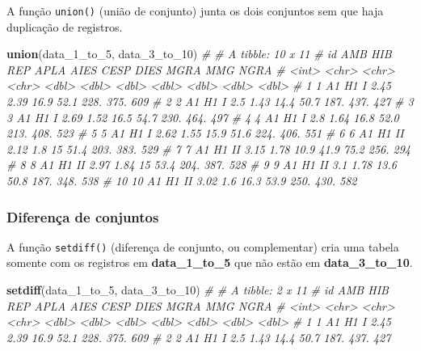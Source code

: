 \documentclass[
]{book}
\newenvironment{Shaded}{\begin{snugshade}}{\end{snugshade}}
\newcommand{\CommentTok}[1]{\textcolor[rgb]{0.56,0.35,0.01}{\textit{#1}}}
\newcommand{\DecValTok}[1]{\textcolor[rgb]{0.00,0.00,0.81}{#1}}
\newcommand{\KeywordTok}[1]{\textcolor[rgb]{0.13,0.29,0.53}{\textbf{#1}}}
\newcommand{\NormalTok}[1]{#1}
\begin{document}
A função \texttt{union()} (união de conjunto) junta os dois conjuntos sem que haja duplicação de registros.

\begin{Shaded}
\begin{Highlighting}[]
\KeywordTok{union}\NormalTok{(data_}\DecValTok{1}\NormalTok{_to_}\DecValTok{5}\NormalTok{, data_}\DecValTok{3}\NormalTok{_to_}\DecValTok{10}\NormalTok{)}
\CommentTok{# # A tibble: 10 x 11}
\CommentTok{#       id AMB   HIB   REP    APLA  AIES  CESP  DIES  MGRA   MMG  NGRA}
\CommentTok{#    <int> <chr> <chr> <chr> <dbl> <dbl> <dbl> <dbl> <dbl> <dbl> <dbl>}
\CommentTok{#  1     1 A1    H1    I      2.45  2.39  16.9  52.1 228.   375.   609}
\CommentTok{#  2     2 A1    H1    I      2.5   1.43  14.4  50.7 187.   437.   427}
\CommentTok{#  3     3 A1    H1    I      2.69  1.52  16.5  54.7 230.   464.   497}
\CommentTok{#  4     4 A1    H1    I      2.8   1.64  16.8  52.0 213.   408.   523}
\CommentTok{#  5     5 A1    H1    I      2.62  1.55  15.9  51.6 224.   406.   551}
\CommentTok{#  6     6 A1    H1    II     2.12  1.8   15    51.4 203.   383.   529}
\CommentTok{#  7     7 A1    H1    II     3.15  1.78  10.9  41.9  75.2  256.   294}
\CommentTok{#  8     8 A1    H1    II     2.97  1.84  15    53.4 204.   387.   528}
\CommentTok{#  9     9 A1    H1    II     3.1   1.78  13.6  50.8 187.   348.   538}
\CommentTok{# 10    10 A1    H1    II     3.02  1.6   16.3  53.9 250.   430.   582}
\end{Highlighting}
\end{Shaded}

\hypertarget{diferenuxe7a-de-conjuntos}{%
\subsubsection{Diferença de conjuntos}\label{diferenuxe7a-de-conjuntos}}

A função \texttt{setdiff()}  (diferença de conjunto, ou complementar) cria uma tabela somente com os registros em \textbf{data\_1\_to\_5} que não estão em \textbf{data\_3\_to\_10}.

\begin{Shaded}
\begin{Highlighting}[]
\KeywordTok{setdiff}\NormalTok{(data_}\DecValTok{1}\NormalTok{_to_}\DecValTok{5}\NormalTok{, data_}\DecValTok{3}\NormalTok{_to_}\DecValTok{10}\NormalTok{)}
\CommentTok{# # A tibble: 2 x 11}
\CommentTok{#      id AMB   HIB   REP    APLA  AIES  CESP  DIES  MGRA   MMG  NGRA}
\CommentTok{#   <int> <chr> <chr> <chr> <dbl> <dbl> <dbl> <dbl> <dbl> <dbl> <dbl>}
\CommentTok{# 1     1 A1    H1    I      2.45  2.39  16.9  52.1  228.  375.   609}
\CommentTok{# 2     2 A1    H1    I      2.5   1.43  14.4  50.7  187.  437.   427}
\end{Highlighting}
\end{Shaded}
\end{document}
